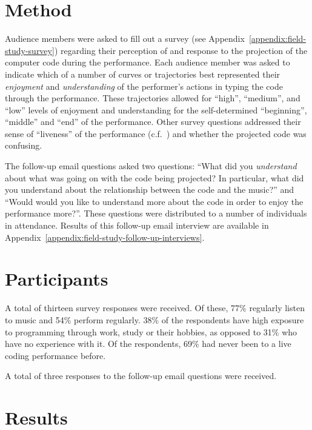 \section{Method}

Audience members were asked to fill out a survey (see Appendix~\ref{appendix:field-study-survey}) regarding their perception of and response to the projection of the computer code during the performance. Each audience member was asked to indicate which of a number of curves or trajectories best represented their \emph{enjoyment} and \emph{understanding} of the performer's actions in typing the code through the performance. These trajectories allowed for ``high'', ``medium'', and ``low'' levels of enjoyment and understanding for the self-determined ``beginning'', ``middle'' and ``end'' of the performance. Other survey questions addressed their sense of ``liveness'' of the performance (c.f.~\cite{Auslander}) and whether the projected code was confusing.

The follow-up email questions asked two questions: ``What did you \emph{understand} about what was going on with the code being projected? In particular, what did you understand about the relationship between the code and the music?'' and ``Would would you like to understand more about the code in order to enjoy the performance more?''. These questions were distributed to a number of individuals in attendance. Results of this follow-up email interview are available in Appendix~\ref{appendix:field-study-follow-up-interviews}.

\section{Participants}

A total of thirteen survey responses were received. Of these, 77\% regularly listen to music and 54\% perform regularly. 38\% of the respondents have high exposure to programming through work, study or their hobbies, as opposed to 31\% who have no experience with it. Of the respondents, 69\% had never been to a live coding performance before. 

A total of three responses to the follow-up email questions were received.

\section{Results}

